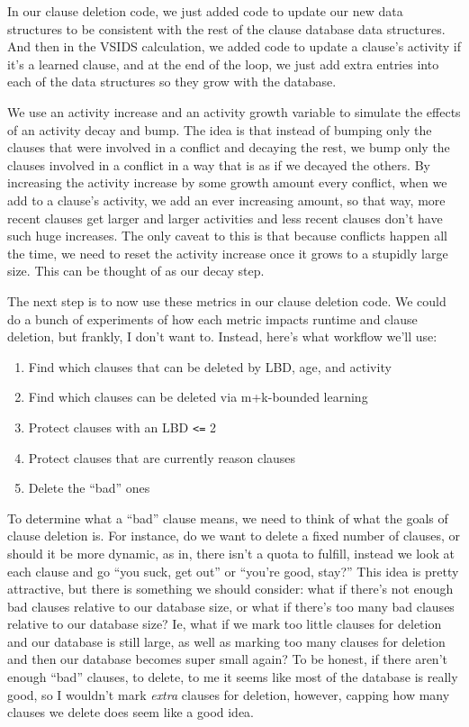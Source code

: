 \noindent
In our clause deletion code, we just added code to update our new data structures
to be consistent with the rest of the clause database data structures. And then 
in the VSIDS calculation, we added code to update a clause's activity if it's 
a learned clause, and at the end of the loop, we just add extra entries into each 
of the data structures so they grow with the database. 

We use an activity increase and an activity growth variable to simulate the effects 
of an activity decay and bump. The idea is that instead of bumping only the clauses 
that were involved in a conflict and decaying the rest, we bump only the clauses 
involved in a conflict in a way that is as if we decayed the others. By increasing 
the activity increase by some growth amount every conflict, when we add to a clause's 
activity, we add an ever increasing amount, so that way, more recent clauses get 
larger and larger activities and less recent clauses don't have such huge increases. 
The only caveat to this is that because conflicts happen all the time, we need to 
reset the activity increase once it grows to a stupidly large size. This can be thought 
of as our decay step.

The next step is to now use these metrics in our clause deletion code. We could do 
a bunch of experiments of how each metric impacts runtime and clause deletion, but 
frankly, I don't want to. Instead, here's what workflow we'll use:
\begin{enumerate}
    \item Find which clauses that can be deleted by LBD, age, and activity
    \item Find which clauses can be deleted via m+k-bounded learning
    \item Protect clauses with an LBD \verb|<=| 2
    \item Protect clauses that are currently reason clauses
    \item Delete the ``bad'' ones
\end{enumerate}
\noindent
To determine what a ``bad'' clause means, we need to think of what the goals of 
clause deletion is. For instance, do we want to delete a fixed number of clauses, 
or should it be more dynamic, as in, there isn't a quota to fulfill, instead we look at 
each clause and go ``you suck, get out'' or ``you're good, stay?'' This idea is pretty 
attractive, but there is something we should consider: what if there's not enough bad 
clauses relative to our database size, or what if there's too many bad clauses relative 
to our database size? Ie, what if we mark too little clauses for deletion and our database 
is still large, as well as marking too many clauses for deletion and then our database 
becomes super small again? To be honest, if there aren't enough ``bad'' clauses, to delete,
to me it seems like most of the database is really good, so I wouldn't mark \textit{extra}
clauses for deletion, however, capping how many clauses we delete does seem like a good idea.

